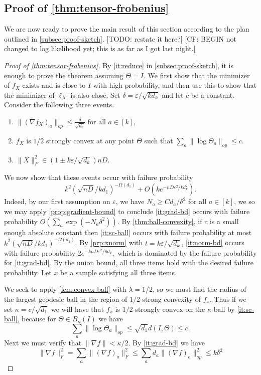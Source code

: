 \documentclass[aos]{imsart}
\theoremstyle{definition}
\numberwithin{equation}{section}
\newcommand{\eps}{\varepsilon}
\newcommand{\samp}{x}
\newcommand{\rv}{X}
\newcommand{\CF}[1]{{\color{purple}[CF: #1]}}
\newcommand{\TODO}[1]{{\color{blue}[TODO: #1]}}
\begin{document}
\subsection{Proof of \cref{thm:tensor-frobenius}}
We are now ready to prove the main result of this section according to the plan outlined in \cref{subsec:proof-sketch}.
\TODO{restate it here?}
\CF{BEGIN not changed to log likelihood yet; this is as far as I got last night.}
\begin{proof}[Proof of \cref{thm:tensor-frobenius}]By \cref{it:reduce} in \cref{subsec:proof-sketch}, it is enough to prove the theorem assuming $\Theta = I$. We first show that the minimizer of $f_\rv$ exists and is close to $I$ with high probability, and then use this to show that the minimizer of $\ell_\rv$ is also close.  Set $\delta = \eps/\sqrt{k d_k}$ and let $c$ be a constant. Consider the following three events.
\begin{enumerate}
\item\label{it:grad-bd} $\|(\nabla f_\rv)_{a}\|_{op} \leq \frac{\delta}{\sqrt{d_{a}}}$ for all $a \in [k]$,
\item\label{it:sc-ball} $f_\rv$ is $1/2$ strongly convex at any point $\Theta$ such that $\sum_a \|\log \Theta_a\|_{op} \leq  c.$
\item\label{it:norm-bd} $\| \rv\|_F^2 \in (1 \pm k \eps/\sqrt{d_k}) nD.$
\end{enumerate}
We now show that these events occur with failure probability $$k^2 \left(\sqrt{nD} / kd_1 \right)^{ - \Omega(d_1)} + O(k e^{ - nD \eps^2 / k d_k^2}).$$ Indeed, by our first assumption on $\eps$, we have $N_a \geq C d_a/\delta^2$ for all $a \in [k]$, we so we may apply \cref{prop:gradient-bound} to conclude \cref{it:grad-bd} occurs with failure probability $O\left( \sum_a \exp ( - N_a \delta^2)\right)$.
By \cref{thm:ball-convexity}, if $c$ is a small enough absolute constant then \cref{it:sc-ball} occurs with failure probability at most $k^2 \left(\sqrt{nD} / kd_1 \right)^{ - \Omega(d_1)}$. By \cref{prp:xnorm} with $t = k \eps/\sqrt{d_k}$, \cref{it:norm-bd} occurs with failure probability $2e^{- k nD \eps^2/8 d_k},$ which is dominated by the failure probability for \cref{it:grad-bd}. By the union bound, all three items hold with the desired failure probability. Let $\samp$ be a sample satisfying all three items.


We seek to apply \cref{lem:convex-ball} with $\lambda = 1/2$, so we must find the radius of the largest geodesic ball in the region of $1/2$-strong convexity of $f_\samp$. Thus if we set $\kappa = c/\sqrt{d_1}$ we will have that $f_\samp$ is $1/2$-strongly convex on the $\kappa$-ball by \cref{it:sc-ball}, because for $\Theta \in B_\kappa(I)$ we have
$$ \sum_a \|\log \Theta_a\|_{op} \leq \sqrt{d_1} d(I, \Theta) \leq c.$$
Next we must verify that $\|\nabla f\| < \kappa/2$. By \cref{it:grad-bd} we have
\[  \|\nabla f\|_F^{2} = \sum_{a} \|(\nabla f)_{a}\|_{F}^{2} \leq \sum_{a} d_a \|(\nabla f)_{a}\|_{op}^{2} \leq  k \delta^{2} \]


\end{proof}
\end{document}
